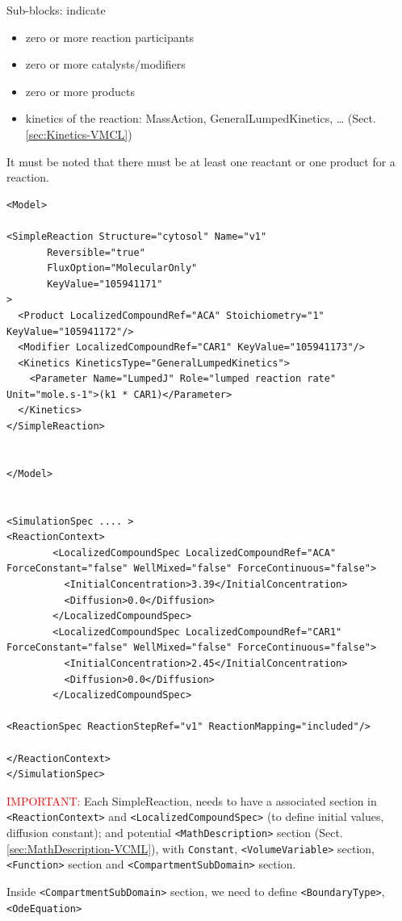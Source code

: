 Sub-blocks: indicate 
\begin{itemize}
  \item zero or more reaction participants
  \item  zero or more catalysts/modifiers 
  \item  zero or more products
  \item  kinetics of the reaction: MassAction, GeneralLumpedKinetics, \ldots
  (Sect.\ref{sec:Kinetics-VMCL})
\end{itemize} 
It must be noted that there must be at least  one reactant or one product for a
reaction.

\begin{verbatim}
<Model>

<SimpleReaction Structure="cytosol" Name="v1" 
       Reversible="true" 
       FluxOption="MolecularOnly" 
       KeyValue="105941171"
>
  <Product LocalizedCompoundRef="ACA" Stoichiometry="1" KeyValue="105941172"/>
  <Modifier LocalizedCompoundRef="CAR1" KeyValue="105941173"/>
  <Kinetics KineticsType="GeneralLumpedKinetics">
    <Parameter Name="LumpedJ" Role="lumped reaction rate" Unit="mole.s-1">(k1 * CAR1)</Parameter>
  </Kinetics>
</SimpleReaction>


</Model>


<SimulationSpec .... >
<ReactionContext>
        <LocalizedCompoundSpec LocalizedCompoundRef="ACA" ForceConstant="false" WellMixed="false" ForceContinuous="false">
          <InitialConcentration>3.39</InitialConcentration>
          <Diffusion>0.0</Diffusion>
        </LocalizedCompoundSpec>
        <LocalizedCompoundSpec LocalizedCompoundRef="CAR1" ForceConstant="false" WellMixed="false" ForceContinuous="false">
          <InitialConcentration>2.45</InitialConcentration>
          <Diffusion>0.0</Diffusion>
        </LocalizedCompoundSpec>

<ReactionSpec ReactionStepRef="v1" ReactionMapping="included"/>

</ReactionContext>
</SimulationSpec>
\end{verbatim}

\textcolor{red}{IMPORTANT:} Each SimpleReaction, needs to have a associated
section in \verb!<ReactionContext>! and \verb!<LocalizedCompoundSpec>! (to
define initial values, diffusion constant); and potential 
\verb!<MathDescription>! section (Sect.\ref{sec:MathDescription-VCML}),
with \verb!Constant!, \verb!<VolumeVariable>! section, \verb!<Function>!
section and \verb!<CompartmentSubDomain>! section. 

Inside \verb!<CompartmentSubDomain>! section, we need to define 
\verb!<BoundaryType>!, \verb!<OdeEquation>!
  

